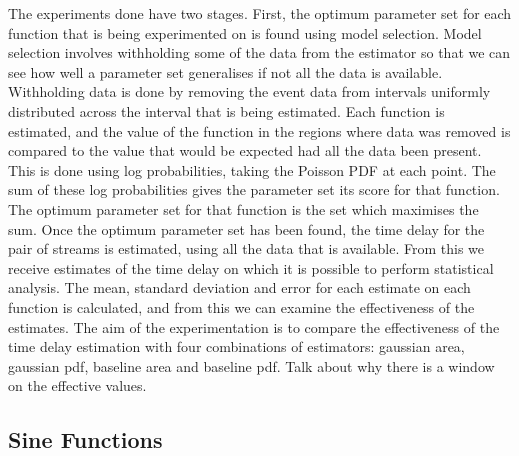 \documentclass[a4paper,11pt]{article}
\begin{document}
The experiments done have two stages. First, the optimum parameter set for each
function that is being experimented on is found using model selection. Model
selection involves withholding some of the data from the estimator so that we
can see how well a parameter set generalises if not all the data is
available. Withholding data is done by removing the event data from intervals
uniformly distributed across the interval that is being estimated. Each function
is estimated, and the value of the function in the regions where data was
removed is compared to the value that would be expected had all the data been
present. This is done using log probabilities, taking the Poisson PDF at each
point. The sum of these log probabilities gives the parameter set its score for
that function. The optimum parameter set for that function is the set which
maximises the sum. Once the optimum parameter set has been found, the time delay
for the pair of streams is estimated, using all the data that is available. From
this we receive estimates of the time delay on which it is possible to perform
statistical analysis. The mean, standard deviation and error for each estimate
on each function is calculated, and from this we can examine the effectiveness
of the estimates. The aim of the experimentation is to compare the effectiveness
of the time delay estimation with four combinations of estimators: gaussian
area, gaussian pdf, baseline area and baseline pdf.
Talk about why there is a window on the effective values.
\subsection{Sine Functions}
\label{sec-7-1}
\end{document}

